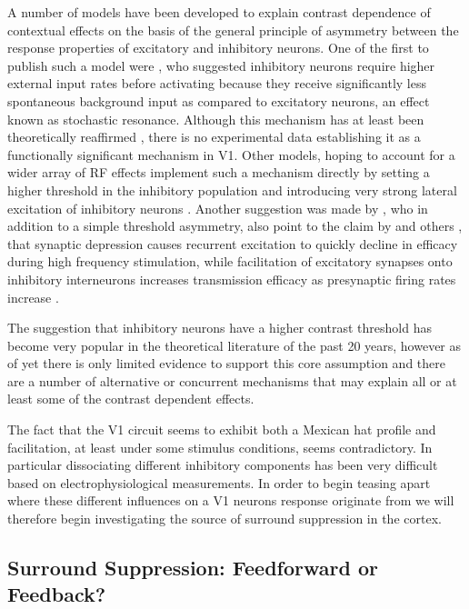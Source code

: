 A number of models have been developed to explain contrast dependence
of contextual effects on the basis of the general principle of
asymmetry between the response properties of excitatory and inhibitory
neurons. One of the first to publish such a model were
\cite{Stemmler1995}, who suggested inhibitory neurons require higher
external input rates before activating because they receive
significantly less spontaneous background input as compared to
excitatory neurons, an effect known as stochastic resonance. Although
this mechanism has at least been theoretically reaffirmed
\citep{Bezrukov1997}, there is no experimental data establishing it as
a functionally significant mechanism in V1. Other models, hoping to
account for a wider array of RF effects implement such a mechanism
directly by setting a higher threshold in the inhibitory population
and introducing very strong lateral excitation of inhibitory neurons
\citep{Schwabe2006}. Another suggestion was made by \cite{Somers1998},
who in addition to a simple threshold asymmetry, also point to the
claim by \cite{Thomson1994} and others \citep{Abbott1997,Tsodyks1997},
that synaptic depression causes recurrent excitation to quickly
decline in efficacy during high frequency stimulation, while
facilitation of excitatory synapses onto inhibitory interneurons
increases transmission efficacy as presynaptic firing rates increase
\citep{Thomson1995}.

The suggestion that inhibitory neurons have a higher contrast
threshold has become very popular in the theoretical literature of the
past 20 years, however as of yet there is only limited evidence to
support this core assumption and there are a number of alternative or
concurrent mechanisms that may explain all or at least some of the
contrast dependent effects.

The fact that the V1 circuit seems to exhibit both a Mexican hat
profile and facilitation, at least under some stimulus conditions,
seems contradictory. In particular dissociating different inhibitory
components has been very difficult based on electrophysiological
measurements. In order to begin teasing apart where these different
influences on a V1 neurons response originate from we will therefore
begin investigating the source of surround suppression in the cortex.

\subsection{Surround Suppression: Feedforward or Feedback?}

